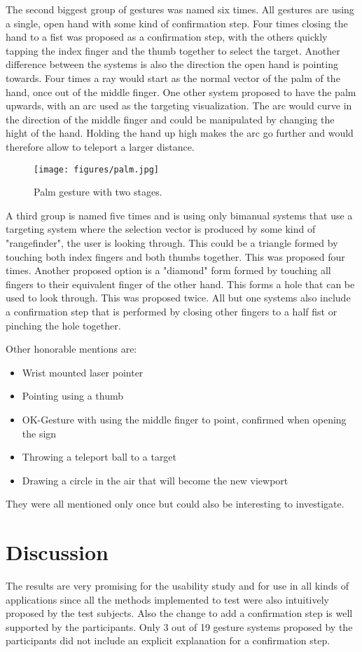 The second biggest group of gestures was named six times. All gestures are using a single, open hand with some kind of confirmation step. Four times closing the hand to a fist was proposed as a confirmation step, with the others quickly tapping the index finger and the thumb together to select the target. Another difference between the systems is also the direction the open hand is pointing towards. Four times a ray would start as the normal vector of the palm of the hand, once out of the middle finger. One other system proposed to have the palm upwards, with an arc used as the targeting visualization. The arc would curve in the direction of the middle finger and could be manipulated by changing the hight of the hand. Holding the hand up high makes the arc go further and would therefore allow to teleport a larger distance.

\begin{figure}[!h]
    \centering
    \texttt{[image: figures/palm.jpg]}
    \caption{Palm gesture with two stages.}
    \label{fig:index2}
\end{figure}

A third group is named five times and is using only bimanual systems that use a targeting system where the selection vector is produced by some kind of "rangefinder", the user is looking through. This could be a triangle formed by touching both index fingers and both thumbs together. This was proposed four times. Another proposed option is a "diamond" form formed by touching all fingers to their equivalent finger of the other hand. This forms a hole that can be used to look through. This was proposed twice. All but one systems also include a confirmation step that is performed by closing other fingers to a half fist or pinching the hole together.

Other honorable mentions are:
\begin{itemize}
    \item Wrist mounted laser pointer
    \item Pointing using a thumb
    \item OK-Gesture with using the middle finger to point, confirmed when opening the sign
    \item Throwing a teleport ball to a target
    \item Drawing a circle in the air that will become the new viewport
\end{itemize}

They were all mentioned only once but could also be interesting to investigate.

\section{Discussion}
The results are very promising for the usability study and for use in all kinds of applications since all the methods implemented to test were also intuitively proposed by the test subjects. Also the change to add a confirmation step is well supported by the participants. Only 3 out of 19 gesture systems proposed by the participants did not include an explicit explanation for a confirmation step. 
